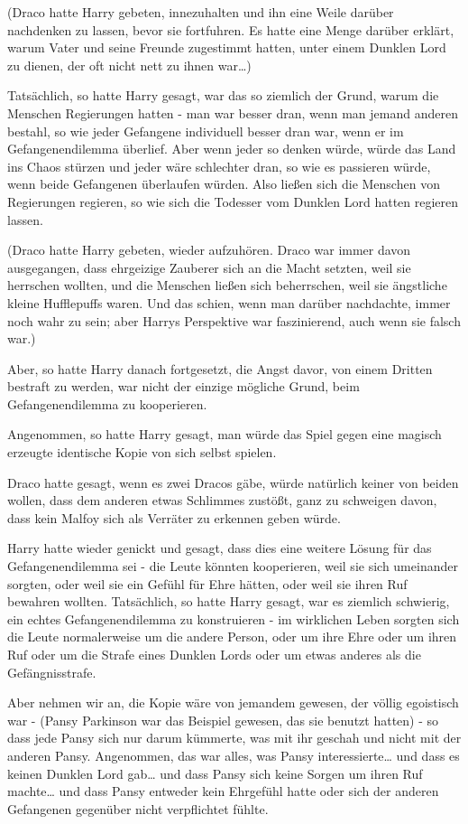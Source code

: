 {(Draco hatte Harry gebeten, innezuhalten und ihn eine Weile darüber nachdenken zu lassen, bevor sie fortfuhren. Es hatte eine Menge darüber erklärt, warum Vater und seine Freunde zugestimmt hatten, unter einem Dunklen Lord zu dienen, der oft nicht nett zu ihnen war…)

Tatsächlich, so hatte Harry gesagt, war das so ziemlich der Grund, warum die Menschen Regierungen hatten - man war besser dran, wenn man jemand anderen bestahl, so wie jeder Gefangene individuell besser dran war, wenn er im Gefangenendilemma überlief. Aber wenn jeder so denken würde, würde das Land ins Chaos stürzen und jeder wäre schlechter dran, so wie es passieren würde, wenn beide Gefangenen überlaufen würden. Also ließen sich die Menschen von Regierungen regieren, so wie sich die Todesser vom Dunklen Lord hatten regieren lassen.

(Draco hatte Harry gebeten, wieder aufzuhören. Draco war immer davon ausgegangen, dass ehrgeizige Zauberer sich an die Macht setzten, weil sie herrschen wollten, und die Menschen ließen sich beherrschen, weil sie ängstliche kleine Hufflepuffs waren. Und das schien, wenn man darüber nachdachte, immer noch wahr zu sein; aber Harrys Perspektive war faszinierend, auch wenn sie falsch war.)

Aber, so hatte Harry danach fortgesetzt, die Angst davor, von einem Dritten bestraft zu werden, war nicht der einzige mögliche Grund, beim Gefangenendilemma zu kooperieren.

Angenommen, so hatte Harry gesagt, man würde das Spiel gegen eine magisch erzeugte identische Kopie von sich selbst spielen.

Draco hatte gesagt, wenn es zwei Dracos gäbe, würde natürlich keiner von beiden wollen, dass dem anderen etwas Schlimmes zustößt, ganz zu schweigen davon, dass kein Malfoy sich als Verräter zu erkennen geben würde.

Harry hatte wieder genickt und gesagt, dass dies eine weitere Lösung für das Gefangenendilemma sei - die Leute könnten kooperieren, weil sie sich umeinander sorgten, oder weil sie ein Gefühl für Ehre hätten, oder weil sie ihren Ruf bewahren wollten. Tatsächlich, so hatte Harry gesagt, war es ziemlich schwierig, ein echtes Gefangenendilemma zu konstruieren - im wirklichen Leben sorgten sich die Leute normalerweise um die andere Person, oder um ihre Ehre oder um ihren Ruf oder um die Strafe eines Dunklen Lords oder um etwas anderes als die Gefängnisstrafe.

Aber nehmen wir an, die Kopie wäre von jemandem gewesen, der völlig egoistisch war - (Pansy Parkinson war das Beispiel gewesen, das sie benutzt hatten) - so dass jede Pansy sich nur darum kümmerte, was mit ihr geschah und nicht mit der anderen Pansy. Angenommen, das war alles, was Pansy interessierte… und dass es keinen Dunklen Lord gab… und dass Pansy sich keine Sorgen um ihren Ruf machte… und dass Pansy entweder kein Ehrgefühl hatte oder sich der anderen Gefangenen gegenüber nicht verpflichtet fühlte.

}
